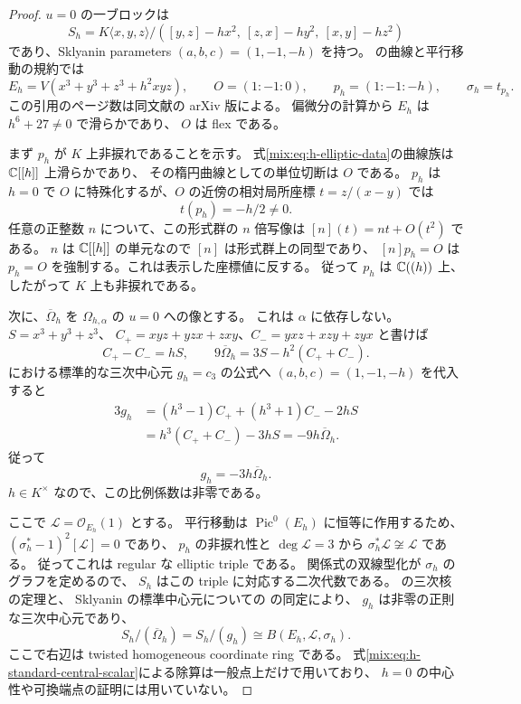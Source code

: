 \begin{proof}
$u=0$ の一ブロックは
\[
 S_h=K\langle x,y,z\rangle/
 ([y,z]-hx^2,\ [z,x]-hy^2,\ [x,y]-hz^2)
\]
であり、Sklyanin parameters $(a,b,c)=(1,-1,-h)$ を持つ。
\cite[Section~1, pp.~1--2]{GRSklyaninDLL}の曲線と平行移動の規約では
\begin{equation}\label{mix:eq:h-elliptic-data}
 E_h=V(x^3+y^3+z^3+h^2xyz),\qquad
 O=(1:-1:0),\qquad p_h=(1:-1:-h),\qquad
 \sigma_h=t_{p_h}.
\end{equation}
この引用のページ数は同文献の arXiv 版による。
偏微分の計算から $E_h$ は $h^6+27\ne0$ で滑らかであり、
$O$ は flex である。

まず $p_h$ が $K$ 上非捩れであることを示す。
式\eqref{mix:eq:h-elliptic-data}の曲線族は $\mathbb C[[h]]$ 上滑らかであり、
その楕円曲線としての単位切断は $O$ である。
$p_h$ は $h=0$ で $O$ に特殊化するが、$O$ の近傍の相対局所座標
$t=z/(x-y)$ では
\[
 t(p_h)=-h/2\ne0.
\]
任意の正整数 $n$ について、この形式群の $n$ 倍写像は
$[n](t)=nt+O(t^2)$ である。
$n$ は $\mathbb C[[h]]$ の単元なので $[n]$ は形式群上の同型であり、
$[n]p_h=O$ は $p_h=O$ を強制する。これは表示した座標値に反する。
従って $p_h$ は $\mathbb C((h))$ 上、したがって $K$ 上も非捩れである。

次に、$\overline\Omega_h$ を $\Omega_{h,\alpha}$ の $u=0$ への像とする。
これは $\alpha$ に依存しない。
$S=x^3+y^3+z^3$、
$C_+=xyz+yzx+zxy$、$C_-=yxz+xzy+zyx$ と書けば
\[
 C_+-C_-=hS,\qquad
 9\overline\Omega_h=3S-h^2(C_++C_-).
\]
\cite[Section~2, p.~3]{GRSklyaninDLL}における標準的な三次中心元 $g_h=c_3$ の公式へ
$(a,b,c)=(1,-1,-h)$ を代入すると
\begin{align*}
 3g_h
 &=(h^3-1)C_++(h^3+1)C_--2hS\\
 &=h^3(C_++C_-)-3hS=-9h\overline\Omega_h.
\end{align*}
従って
\begin{equation}\label{mix:eq:h-standard-central-scalar}
 g_h=-3h\overline\Omega_h.
\end{equation}
$h\in K^\times$ なので、この比例係数は非零である。

ここで $\mathcal L=\mathcal O_{E_h}(1)$ とする。
平行移動は $\operatorname{Pic}^0(E_h)$ に恒等に作用するため、
$(\sigma_h^*-1)^2[\mathcal L]=0$ であり、
$p_h$ の非捩れ性と $\deg\mathcal L=3$ から
$\sigma_h^*\mathcal L\not\cong\mathcal L$ である。
従ってこれは regular な elliptic triple である。
関係式の双線型化が $\sigma_h$ のグラフを定めるので、
$S_h$ はこの triple に対応する二次代数である。
\cite[Theorem~6.8(i),(ii)]{GRSklyaninATV}の三次核の定理と、
Sklyanin の標準中心元についての
\cite[Section~1, p.~1]{GRSklyaninDLL}の同定により、
$g_h$ は非零の正則な三次中心元であり、
\begin{equation}\label{mix:eq:h-thcr-quotient}
 S_h/(\overline\Omega_h)=S_h/(g_h)
 \cong B(E_h,\mathcal L,\sigma_h).
\end{equation}
ここで右辺は twisted homogeneous coordinate ring である。
式\eqref{mix:eq:h-standard-central-scalar}による除算は一般点上だけで用いており、
$h=0$ の中心性や可換端点の証明には用いていない。


\end{proof}
